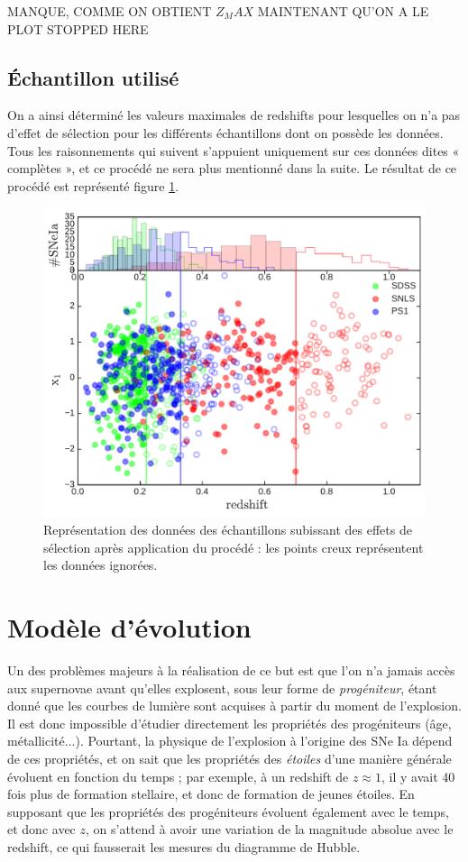 \documentclass[a4paper, 12pt, svgnames]{article}
\newcommand{\mr}[1]{{\textcolor[rgb]{0.80,0.10,0.1}{#1}}}
\begin{document}
\mr{MANQUE, COMME ON OBTIENT $Z_MAX$ MAINTENANT QU'ON A LE PLOT}
\mr{STOPPED HERE}

\subsection{Échantillon utilisé}

On a ainsi déterminé les valeurs maximales de redshifts pour lesquelles on n'a
pas d'effet de sélection pour les différents échantillons dont on possède les
données. Tous les raisonnements qui suivent s'appuient uniquement sur ces
données dites « complètes », et ce procédé ne sera plus mentionné dans la suite.
Le résultat de ce procédé est représenté figure \ref{fig:surveys_cuts}.

\begin{figure}[htbp!]
    \centering
    \includegraphics[width=.5\linewidth]{Rapport_figures/surveys_cuts.pdf}
    \captionsetup{justification=centering}
    \caption{Représentation des données des échantillons subissant des effets
    de sélection après application du procédé : les points creux représentent
    les données ignorées.}
    \label{fig:surveys_cuts}
\end{figure}

\section{Modèle d'évolution}\label{sec:stretchevol}
Un des problèmes majeurs à la réalisation de ce but est que l'on n'a jamais
accès aux supernovae avant qu'elles explosent, sous leur forme de
\textit{progéniteur}, étant donné que les courbes de lumière sont acquises à
partir du moment de l'explosion. Il est donc impossible d'étudier directement
les propriétés des progéniteurs (âge, métallicité...). Pourtant, la physique de
l'explosion à l'origine des SNe Ia dépend de ces propriétés, et on sait que les
propriétés des \textit{étoiles} d'une manière générale évoluent en fonction du
temps ; par exemple, à un redshift de $z \approx 1$, il y avait 40 fois plus de
formation stellaire, et donc de formation de jeunes étoiles. En supposant que
les propriétés des progéniteurs évoluent également avec le temps, et donc avec
$z$, on s'attend à avoir une variation de la magnitude absolue avec le redshift,
ce qui fausserait les mesures du diagramme de Hubble.
\end{document}
